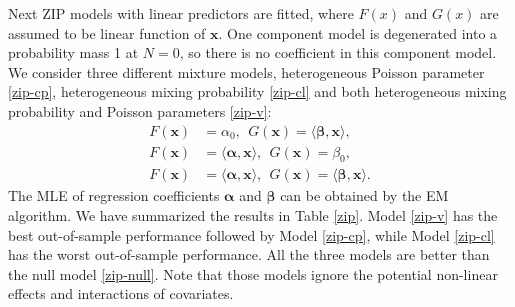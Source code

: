 \documentclass[11pt]{article}
\numberwithin{equation}{section}
\def\bx{\boldsymbol{x}}
\begin{document}
Next ZIP models with linear predictors are fitted, where $F(x)$ and $G(x)$ are assumed to be linear function of $\bx$.
One component model is degenerated into a probability mass 1 at $N=0$, so there is no coefficient in this component model. 
We consider three different mixture models, heterogeneous Poisson parameter  \eqref{zip-cp}, heterogeneous mixing probability \eqref{zip-cl} and both heterogeneous  mixing probability and Poisson parameters \eqref{zip-v}:
\begin{align}
	F(\bx)&=\alpha_0, ~~G(\bx)=\langle \boldsymbol{\beta}, \bx\rangle, \label{zip-cp} \\
	F(\bx)&=\langle \boldsymbol{\alpha},\bx\rangle, ~~G(\bx)=\beta_0, \label{zip-cl} \\
	F(\bx)&=\langle \boldsymbol{\alpha},\bx \rangle, ~~G(\bx)=\langle \boldsymbol{\beta}, \bx \rangle. \label{zip-v}
\end{align}  
The MLE of regression coefficients $\boldsymbol{\alpha}$ and $\boldsymbol{\beta}$ can be obtained by the EM algorithm.
We have summarized the results in Table \ref{zip}.
Model \eqref{zip-v} has the best out-of-sample performance followed by Model \eqref{zip-cp}, while Model \eqref{zip-cl} has the worst out-of-sample performance.
All the three models are better than the null model \eqref{zip-null}.
Note that those models ignore the potential non-linear effects and interactions of covariates.
\end{document}
